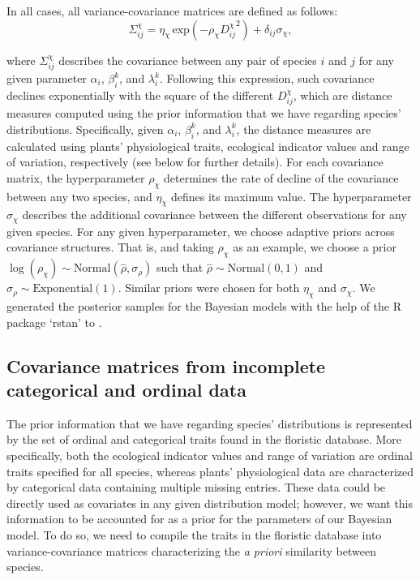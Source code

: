 \documentclass[11pt, a4paper]{article}
\begin{document}
In all cases, all variance-covariance matrices are defined as follows:
\begin{equation} 
\Sigma^{\chi}_{ij} = \eta_{\chi}\,\text{exp}\left(-\rho_{\chi} {D^{\chi}_{ij}}^2\right) + \delta_{ij} \sigma_{\chi} ,
\label{eq:covariance}
\end{equation}

where $\Sigma^{\chi}_{ij}$ describes the covariance between any pair of species $i$ and $j$ for any given parameter $\alpha_i$, $\beta_i^k$, and $\lambda_i^k$. Following this expression, such covariance declines exponentially with the square of the different $D^{\chi}_{ij}$, which are distance measures computed using the prior information that we have regarding species' distributions. Specifically, given $\alpha_i$, $\beta_i^k$, and $\lambda_i^k$, the distance measures are calculated using plants' physiological traits, ecological indicator values and range of variation, respectively (see below for further details). For each covariance matrix, the hyperparameter $\rho_{\chi}$ determines the rate of decline of the covariance between any two species, and $\eta_{\chi}$ defines its maximum value. The hyperparameter $\sigma_{\chi}$ describes the additional covariance between the different observations for any given species. For any given hyperparameter, we choose adaptive priors across covariance structures. That is, and taking $\rho_{\chi}$ as an example, we choose a prior $\log\left(\rho_{\chi}\right)\sim \text{Normal}\left(\hat{\rho}, \sigma_{\rho}\right)$ such that $\hat{\rho}\sim \text{Normal}\left(0, 1\right)$ and $\sigma_{\rho}\sim \text{Exponential}\left(1\right)$. Similar priors were chosen for both $\eta_{\chi}$ and $\sigma_{\chi}$. We generated the posterior samples for the Bayesian models with the help of the R package `rstan' to \citep{rstan}.


\subsection*{Covariance matrices from incomplete categorical and ordinal data}
The prior information that we have regarding species' distributions is represented by the set of ordinal and categorical traits found in the floristic database. More specifically, both the ecological indicator values and range of variation are ordinal traits specified for all species, whereas plants' physiological data are characterized by categorical data containing multiple missing entries. These data could be directly used as covariates in any given distribution model; however, we want this information to be accounted for as a prior for the parameters of our Bayesian model. To do so, we need to compile the traits in the floristic database into variance-covariance matrices characterizing the \textit{a priori} similarity between species.
\end{document}
